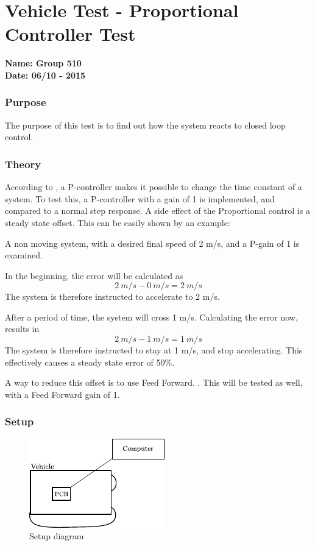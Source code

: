\pagebreak
\section{Vehicle Test - Proportional Controller Test} \label{app:proportionalControllerTest}
\textbf{Name: Group 510}\\
\textbf{Date: 06/10 - 2015}

\subsubsection{Purpose}
The purpose of this test is to find out how the system reacts to closed loop control.

\subsubsection{Theory}
According to , a P-controller makes it possible to change the time constant of a system. To test this, a P-controller with a gain of 1 is implemented, and compared to a normal step response.
A side effect of the Proportional control is a steady state offset. This can be easily shown by an example:

A non moving system, with a desired final speed of 2 m/s, and a P-gain of 1 is examined.

In the beginning, the error will be calculated as $$\SI{2}{m/s} - \SI{0}{m/s} = \SI{2}{m/s}$$
The system is therefore instructed to accelerate to 2 m/s.

After a period of time, the system will cross 1 m/s. Calculating the error now, results in $$\SI{2}{m/s}-\SI{1}{m/s}=\SI{1}{m/s}$$
The system is therefore instructed to stay at 1 m/s, and stop accelerating. This effectively causes a steady state error of 50\%.

A way to reduce this offset is to use Feed Forward. . This will be tested as well, with a Feed Forward gain of 1.

\subsubsection{Setup}

\begin{figure}[H]
	\centering
	\includegraphics[scale=1.6]{figures/inertiaTestSetupDiagram2.pdf}
	\caption{Setup diagram}
	\label{GainAndTimeTestSetupDiagram}
\end{figure}

